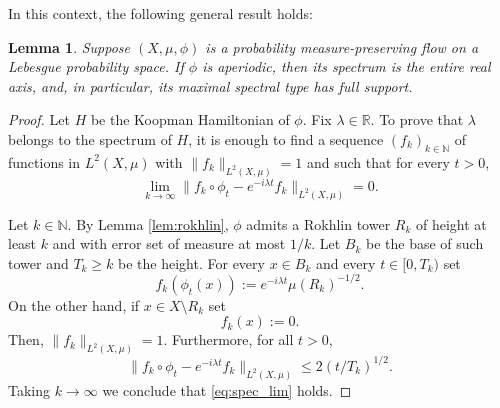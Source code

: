 \documentclass{amsart}
\newtheorem{lemma}[theorem]{Lemma}
\theoremstyle{definition}
\theoremstyle{remark}
\numberwithin{equation}{section}
\newcommand{\<}{{\langle}}
\renewcommand{\>}{{\rangle}}
\newcommand{\field}[1]{\mathbb{#1}}
\newcommand{\R}{\field{R}}
\newcommand{\N}{\field{N}}
\begin{document}
In this context, the following general result holds:

\begin{lemma} 
\label{lemma:no_gaps}
Suppose $(X,\mu,\phi)$ is a probability measure-preserving flow on a Lebesgue probability space. If $\phi$ is aperiodic, then its spectrum is the entire real axis, and, in particular, its maximal spectral type has full support.
\end{lemma}

\begin{proof} 
Let $H$ be the Koopman Hamiltonian of $\phi$. Fix $\lambda \in \mathbb{R}$. To prove that $\lambda$ belongs to the spectrum of $H$, it is enough to find a sequence $(f_k)_{k \in \mathbb{N}}$ of functions in $L^2(X,\mu)$ with $\|f_k\|_{L^2(X,\mu)} = 1$ and such that for every $t > 0$,
\begin{equation}
\label{eq:spec_lim}
\lim_{k \to \infty} \|f_k \circ \phi_t - e^{-i\lambda t} f_k\|_{L^2(X,\mu)} = 0.
\end{equation}

Let $k \in \mathbb{N}$. By Lemma \ref{lem:rokhlin}, $\phi$ admits a Rokhlin tower $R_k$ of height at least $k$ and with error set of measure at most $1/k$. Let $B_k$ be the base of such tower and $T_k \geq k$ be the height. For every $x \in B_k$ and every $t \in [0,T_k)$ set
\[
f_k(\phi_t(x)) := e^{-i \lambda t} \mu(R_k)^{-1/2}.
\]
On the other hand, if $x \in X \setminus R_k$ set
\[
f_k(x) := 0.
\]
Then, $\|f_k\|_{L^2(X,\mu)} = 1$. Furthermore, for all $t > 0$,
\[
\|f_k \circ \phi_t - e^{-i\lambda t} f_k\|_{L^2(X,\mu)} \leq  2(t/T_k)^{1/2}.
\]
Taking $k \to \infty$ we conclude that \eqref{eq:spec_lim} holds.
\end{proof}
\end{document}
